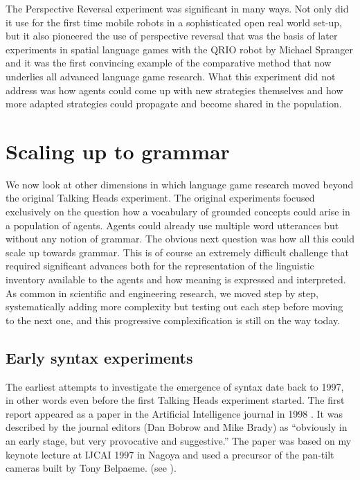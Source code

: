 The Perspective Reversal experiment was significant in many ways. Not only did it use for the first time mobile robots in a 
sophisticated open real world set-up, but it also pioneered the use of perspective reversal that was the basis of later 
experiments in spatial language games with the QRIO robot by Michael Spranger and it was the first convincing example of 
the comparative method that now underlies all advanced language game research. What this experiment did not address
was how agents could come up with new strategies themselves and how more adapted strategies could propagate and become 
shared in the population. 

\section{Scaling up to grammar}

We now look at other dimensions in which language game research moved beyond the original 
Talking Heads experiment. 
The original experiments focused exclusively
on the question how a vocabulary of grounded concepts could arise in a population 
of agents. Agents could already use multiple word utterances but without any notion of grammar. 
The obvious next question was how all this could scale up towards grammar. This is of course an extremely difficult
challenge that required significant advances both for the representation of the linguistic inventory 
available to the agents and how meaning is expressed and interpreted. As common in 
scientific and engineering research, we moved step by step, systematically adding more complexity but 
testing out each step before moving to the next one, and this progressive complexification is still on the way today.

\subsection{Early syntax experiments}

The earliest attempts to investigate the emergence of syntax date back to 1997, in other words even before 
the first Talking Heads experiment started. The first report 
appeared as a paper in the Artificial Intelligence journal in 1998 \citep{Steels:1998}. 
It was described by the journal editors (Dan Bobrow and 
Mike Brady) as ``obviously in an early stage, but very provocative and suggestive.'' The paper was based on my keynote 
lecture at IJCAI 1997 in Nagoya and used a precursor of the pan-tilt cameras built by Tony Belpaeme. 
(see ). 

